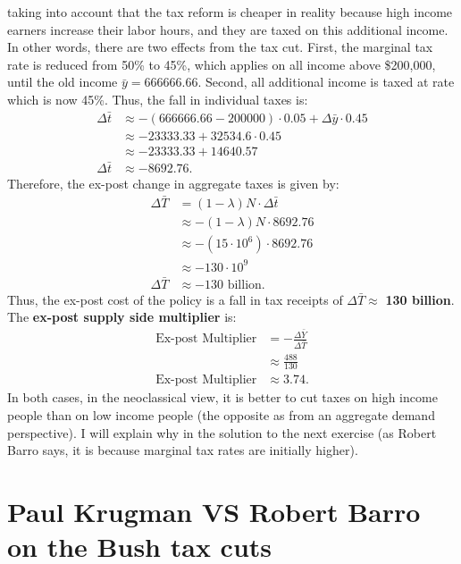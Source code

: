 \documentclass[]{book}
\begin{document}
\begin{enumerate}
  taking into account that the tax reform is cheaper in reality because
  high income earners increase their labor hours, and they are taxed on
  this additional income. In other words, there are two effects from the
  tax cut. First, the marginal tax rate is reduced from 50\% to 45\%,
  which applies on all income above \$200,000, until the old income
  \(\bar{y}=666666.66.\) Second, all additional income is taxed at rate
  which is now 45\%. Thus, the fall in individual taxes is: \[
  \begin{aligned}
  \Delta \bar{t} & \approx -(666666.66-200000) \cdot 0.05 + \Delta \bar{y} \cdot 0.45\\
  & \approx -23333.33 + 32534.6 \cdot  0.45 \\
  & \approx -23333.33 + 14640.57 \\
  \Delta \bar{t} & \approx -8692.76.
  \end{aligned}
  \] Therefore, the ex-post change in aggregate taxes is given by: \[
  \begin{aligned}
  \Delta \bar{T} &= (1-\lambda) N  \cdot \Delta \bar{t}\\
  & \approx - (1-\lambda) N  \cdot 8692.76\\
  & \approx - (15 \cdot 10^6) \cdot 8692.76\\
  & \approx -130 \cdot 10^9 \\
  \Delta \bar{T} & \approx  -130 \text{ billion}.
  \end{aligned}
  \] Thus, the ex-post cost of the policy is a fall in tax receipts of
  \(\Delta \bar{T} \approx\) \textbf{130 billion}. The \textbf{ex-post
  supply side multiplier} is: \[
  \begin{aligned}
  \text{Ex-post Multiplier} &= -\frac{\Delta \bar{Y}}{\Delta \bar{T}}\\
  &  \approx \frac{488}{130}\\
  \text{Ex-post Multiplier} & \approx 3.74.
  \end{aligned}
  \] In both cases, in the neoclassical view, it is better to cut taxes
  on high income people than on low income people (the opposite as from
  an aggregate demand perspective). I will explain why in the solution
  to the next exercise (as Robert Barro says, it is because marginal tax
  rates are initially higher).
\end{enumerate}

\section{Paul Krugman VS Robert Barro on the Bush tax
cuts}\label{paul-krugman-vs-robert-barro-on-the-bush-tax-cuts-1}
\end{document}
